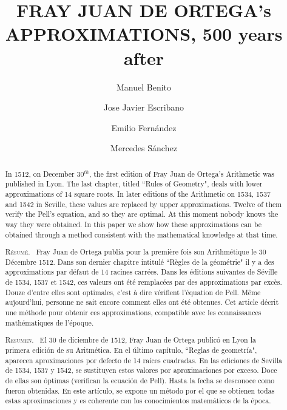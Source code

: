 \documentclass{amsart}
\begin{document}
\title{FRAY JUAN DE ORTEGA's APPROXIMATIONS, 500 years after}

\author[M. Benito]{Manuel Benito
\address{ Logro{\~n}o, La Rioja, Spain}
}

\author[J. J. Escribano]{Jose Javier Escribano
\address{Instituto Valle del Cidacos,
Calahorra, La Rioja, Spain}
}

\author[E. Fern\'andez]{Emilio Fern\'andez
\address{Instituto Sagasta, Glorieta del Doctor Zub{\'\i}a, s/n,
26003, Logro{\~n}o, La Rioja, Spain}
}

\author[M. S\'anchez]{Mercedes S\'anchez
\address{UCM, Madrid, Spain}
}


\begin{abstract}
 In 1512, on December $30^{th}$, the first edition of  Fray Juan de Ortega's Arithmetic was published in Lyon. The last chapter, titled ``Rules of Geometry", deals with lower approximations of 14 square roots.
 In later editions of the Arithmetic on 1534, 1537 and 1542 in Seville,
 these values are replaced  by upper approximations.
 Twelve of them verify the Pell's equation, and so they are optimal.
 At this moment nobody knows the way they were obtained. In this paper we show how these approximations can be obtained through a method consistent with the mathematical knowledge at that time.

\vspace{0.3cm}

{\noindent\scshape R\'esum\'e.\ }
Fray Juan de Ortega
publia pour  la premi\`ere fois son
 Arithm\'etique le 30 D\'ecembre 1512.
 Dans son dernier chapitre intitul\'e ``R\`egles de la g\'eom\'etrie" il y a des approximations par d\'efaut de 14 racines carr\'ees. Dans les \'editions suivantes de S\'eville de 1534, 1537 et 1542, ces valeurs ont \'et\'e remplac\'ees par des approximations par exc\`es. Douze d'entre elles sont optimales, c'est \`a dire v\'erifient l'\'equation de Pell.
 M\^eme aujourd'hui, personne ne sait encore comment elles ont \'et\'e obtenues. Cet article d\'ecrit une m\'ethode pour obtenir  ces approximations, compatible avec les connaissances math\'ematiques de l'\'epoque.

\vspace{0.3cm}

{\noindent\scshape Resumen.\ }
El 30 de diciembre de 1512, Fray Juan de Ortega  public\'o en Lyon la primera edici\'on de su Aritm\'etica. En el \'ultimo cap\'itulo, ``Reglas de geometr\'ia", aparecen aproximaciones por defecto de 14 ra\'ices cuadradas. En las ediciones de Sevilla de 1534, 1537 y 1542, se sustituyen estos valores por aproximaciones por exceso. Doce de ellas son \'optimas (verifican la ecuaci\'on de Pell). Hasta la fecha se desconoce como fueron obtenidas. En este art\'iculo, se expone un m\'etodo por el que se obtienen todas estas aproximaciones y es coherente con los conocimientos matem\'aticos de la \'epoca.

\end{abstract}
\end{document}
